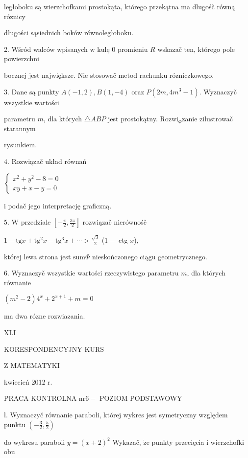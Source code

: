 \documentclass[a4paper,12pt]{article}
\begin{document}
ległoboku są wierzchofkami prostokąta, którego przekątna ma dlugośč równą róznicy

długości sąsiednich boków równoległoboku.

2. Wśród walców wpisanych $\mathrm{w}$ kulę $0$ promieniu $R$ wskazač ten, którego pole powierzchni

bocznej jest największe. Nie stosowač metod rachunku rózniczkowego.

3. Dane są punkty $A(-1,2), B(1,-4)$ oraz $P(2m,4m^{3}-1)$. Wyznaczyč wszystkie wartości

parametru $m$, dla których $\triangle ABP$ jest prostokątny. $\mathrm{R}\mathrm{o}\mathrm{z}\mathrm{w}\mathrm{i}_{\Phi}$zanie zilustrowač starannym

rysunkiem.

4. Rozwiązač układ równań

$\left\{\begin{array}{l}
x^{2}+y^{2}-8=0\\
xy+x-y=0
\end{array}\right.$

$\mathrm{i}$ podač jego interpretację graficzną.

5. $\mathrm{W}$ przedziale $[-\displaystyle \frac{\pi}{2},\frac{3\pi}{2}]$ rozwiązač nierównośč

$1-\displaystyle \mathrm{t}\mathrm{g}x+\mathrm{t}\mathrm{g}^{2}x-\mathrm{t}\mathrm{g}^{3}x+\cdots>\frac{\sqrt{3}}{2}$ ($1-$ ctg $x$),

której lewa strona jest $\mathrm{s}\mathrm{u}\mathrm{m}\Phi$ nieskończonego ciągu geometrycznego.

6. Wyznaczyč wszystkie wartości rzeczywistego parametru $m$, dla których równanie

$(m^{2}-2)4^{x}+2^{x+1}+m=0$

ma dwa rózne rozwiazania.





XLI

KORESPONDENCYJNY KURS

Z MATEMATYKI

kwiecień 2012 r.

PRACA KONTROLNA $\mathrm{n}\mathrm{r} 6-$ POZIOM PODSTAWOWY

l. Wyznaczyč równanie paraboli, której wykres jest symetryczny względem punktu $(-\displaystyle \frac{3}{2},\frac{5}{2})$

do wykresu paraboli $y = (x+2)^{2}$ Wykazač, $\dot{\mathrm{z}}\mathrm{e}$ punkty przecięcia $\mathrm{i}$ wierzchofki obu
\end{document}
